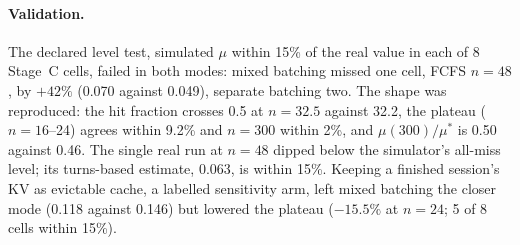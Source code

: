 \paragraph{Validation.} The declared level test, simulated $\mu$ within 15\% of the real value in each of 8 Stage~C cells, failed in both modes: mixed batching missed one cell, FCFS $n=48$, by $+42\%$ (0.070 against 0.049\sps), separate batching two. The shape was reproduced: the hit fraction crosses 0.5 at $n=32.5$ against 32.2, the plateau ($n=16$--24) agrees within 9.2\% and $n=300$ within 2\%, and $\mu(300)/\mu^*$ is 0.50 against 0.46. The single real run at $n=48$ dipped below the simulator's all-miss level; its turns-based estimate, 0.063\sps, is within 15\%. Keeping a finished session's KV as evictable cache, a labelled sensitivity arm, left mixed batching the closer mode (0.118 against 0.146) but lowered the plateau ($-15.5\%$ at $n=24$; 5 of 8 cells within 15\%).

